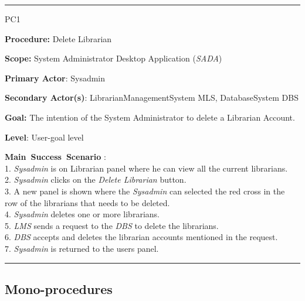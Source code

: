 \vspace{0.5cm}
\hrule
\begin{lyxlist}{PC1}
\small{
\item [\textbf{Procedure:}] Delete Librarian
\item [\textbf{Scope:}] System Administrator Desktop Application (\emph{SADA})
\item [\textbf{Primary Actor}:] Sysadmin
\item [\textbf{Secondary Actor(s)}:] LibrarianManagementSystem MLS,
DatabaseSystem DBS
\item [\textbf{Goal:}] The intention of the System Administrator to
delete a Librarian Account.
\item [\textbf{Level}:] User-goal level
\item [\textbf{Main~Success~Scenario}]:\\
1. \emph{Sysadmin} is on Librarian panel where he can view all the current
librarians.
\\
2. \emph{Sysadmin} clicks on the \emph{Delete Librarian} button. \\
3. A new panel is shown where the \emph{Sysadmin} can selected the red cross in
the row of the librarians that needs to be deleted.
\\
4. \emph{Sysadmin} deletes one or more librarians. 
\\
5. \emph{LMS} sends a request to the \emph{DBS} to delete the librarians.
\\
6. \emph{DBS} accepts and deletes the librarian accounts mentioned in the
request.
\\
7. \emph{Sysadmin} is returned to the users panel. \\
}
\end{lyxlist}
\hrule

\subsection{Mono-procedures}
